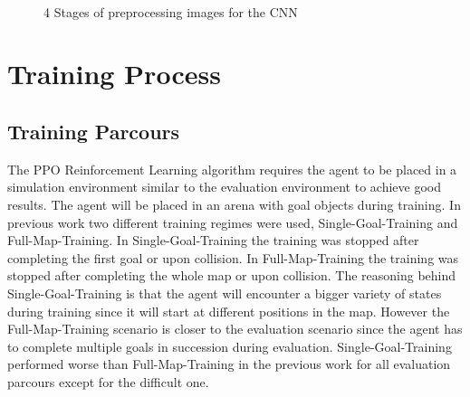 \begin{figure}
\centering
     \qquad
     \\
     \qquad
\caption{4 Stages of preprocessing images for the CNN}
\label{fig:4bildchen}
\end{figure}


\section{Training Process}


\subsection*{Training Parcours}
The PPO Reinforcement Learning algorithm requires the agent to be placed in a simulation environment similar to the evaluation environment to achieve good results. The agent will be placed in an arena with goal objects during training. In previous work \autocite{maximilian} two different training regimes were used, Single-Goal-Training and Full-Map-Training. In Single-Goal-Training the training was stopped after completing the first goal or upon collision. In Full-Map-Training the training was stopped after completing the whole map or upon collision. The reasoning behind Single-Goal-Training is that the agent will encounter a bigger variety of states during training since it will start at different positions in the map. However the Full-Map-Training scenario is closer to the evaluation scenario since the agent has to complete multiple goals in succession during evaluation.
Single-Goal-Training performed worse than Full-Map-Training in the previous work \autocite{maximilian} for all evaluation parcours except for the difficult one. 

